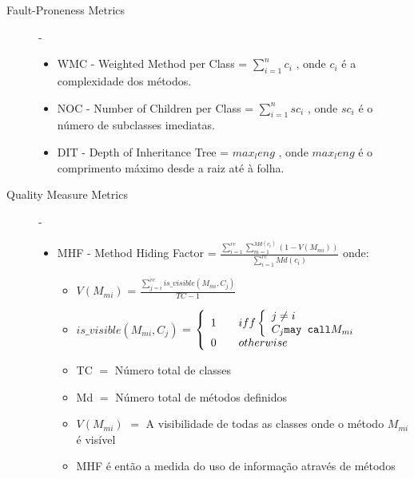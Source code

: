 \begin{description}
 \item [Fault-Proneness Metrics] - \begin{itemize}
                                   \item WMC - Weighted Method per Class  = $ \sum_{i=1}^{n} c_i $ , onde $c_i$ é a complexidade dos métodos.
				   \item NOC - Number of Children per Class = $ \sum_{i=1}^{n} sc_i $ , onde $sc_i$ é o número de subclasses imediatas.
				   \item DIT - Depth of Inheritance Tree  = $ max_leng $ , onde $ max_leng $ é o comprimento máximo desde a raiz até à folha.
                                  \end{itemize}
 \item [Quality Measure Metrics] - \begin{itemize}
                                   \item MHF - Method Hiding Factor = $ \frac{\sum_{i=1}^{rc} \sum_{m=1}^{Md(c_i)} (1-V(M_{mi}))} {\sum_{i=1}^{rc} Md(c_i)} $ onde: \begin{itemize}
																				      \item $V(M_{mi})$ = $\frac{\sum_{j=i}^{rc} is\_visible(M_{mi},C_j)}{TC-1} $
																				      \item $ is\_visible(M_{mi},C_j) $ = \( \left \{ \begin{array}{l l}
																									      1 & \quad iff \left \{ \begin{array}{l l}
																									                              j \neq i \\
																												      C_j \texttt{may call} M_{mi}\\
																									                             \end{array}
\right.\\
																									      0 & \quad otherwise\\
																									    \end{array} \right. \)
																				      \item TC $=$ Número total de classes
																				      \item Md $=$ Número total de métodos definidos
																				      \item $V(M_{mi})$ $=$ A visibilidade de todas as classes onde o método $M_{mi}$ é visível
																				      \item MHF é então a medida do uso de informação através de métodos

\end{itemize}
\end{itemize}
\end{description}
